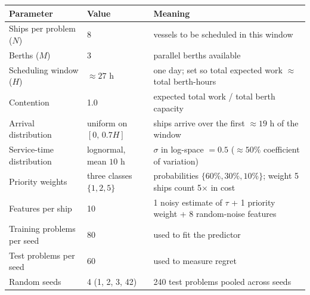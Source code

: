 \documentclass[11pt]{article}
\begin{document}
\begin{center}
\begin{tabular}{@{}lll@{}}
\toprule
Parameter & Value & Meaning \\
\midrule
Ships per problem ($N$)        & 8                            & vessels to be scheduled in this window \\
Berths ($M$)                   & 3                            & parallel berths available \\
Scheduling window ($H$)        & $\approx 27$ h               & one day; set so total expected work $\approx$ total berth-hours \\
Contention                     & 1.0                          & expected total work / total berth capacity \\
Arrival distribution           & uniform on $[0,\,0.7H]$      & ships arrive over the first $\approx 19$ h of the window \\
Service-time distribution      & lognormal, mean $10$ h       & $\sigma$ in log-space $= 0.5$ ($\approx 50\%$ coefficient of variation) \\
Priority weights               & three classes $\{1, 2, 5\}$  & probabilities $\{60\%, 30\%, 10\%\}$; weight 5 ships count 5$\times$ in cost \\
Features per ship              & 10                           & 1 noisy estimate of $\tau$ + 1 priority weight + 8 random-noise features \\
Training problems per seed     & 80                           & used to fit the predictor \\
Test problems per seed         & 60                           & used to measure regret \\
Random seeds                   & 4 (1, 2, 3, 42)              & 240 test problems pooled across seeds \\
\bottomrule
\end{tabular}
\end{center}

\vspace{1em}
\end{document}
